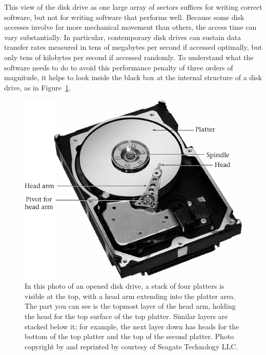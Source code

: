 This view of the disk drive as one large array of sectors suffices for
writing correct software, but not for writing software that performs
well.  Because some disk accesses involve far more mechanical movement
than others, the access time can vary substantially.  In particular,
contemporary disk drives can sustain data transfer rates measured in
tens of megabytes per second if accessed optimally, but only tens of
kilobytes per second if accessed randomly.  To understand what the
software needs to do to avoid this performance penalty of three orders
of magnitude, it helps to look inside the black box at the internal
structure of a disk drive, as in Figure~\ref{photo-8-1}.
\begin{figure}
\centerline{\includegraphics{hail_f0801}}
\caption{In this photo of an opened disk drive, a stack of four
platters is visible at the top, with a head arm
extending into the platter
area.  The part you can see is the topmost layer of the head arm,
holding the head for the top surface of the top platter.  Similar
layers are stacked below it; for example, the next layer down has
heads for the bottom of the top platter and the top of the second
platter.
Photo copyright by and reprinted by courtesy of Seagate Technology LLC.}
\label{photo-8-1}
\end{figure}

